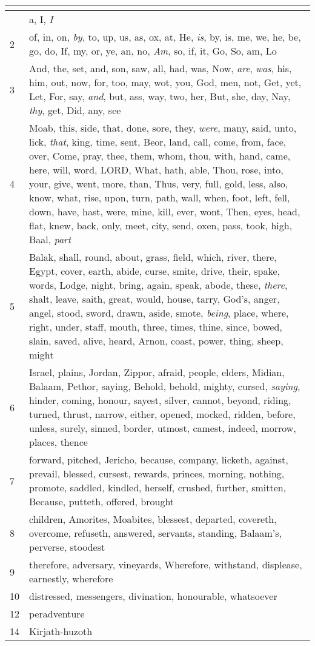 \begin{center}
\begin{longtable}{l|p{3.75in}}
\hline \multicolumn{2}{c}{{ }} \\ \hline
\endfoot 
1 & a, I, \emph{I}\\ \hline 
2 & of, in, on, \emph{by}, to, up, us, as, ox, at, He, \emph{is}, by, is, me, we, he, be, go, do, If, my, or, ye, an, no, \emph{Am}, so, if, it, Go, So, am, Lo\\ \hline 
3 & And, the, set, and, son, saw, all, had, was, Now, \emph{are}, \emph{was}, his, him, out, now, for, too, may, wot, you, God, men, not, Get, yet, Let, For, say, \emph{and}, but, ass, way, two, her, But, she, day, Nay, \emph{thy}, get, Did, any, see\\ \hline 
4 & Moab, this, side, that, done, sore, they, \emph{were}, many, said, unto, lick, \emph{that}, king, time, sent, Beor, land, call, come, from, face, over, Come, pray, thee, them, whom, thou, with, hand, came, here, will, word, LORD, What, hath, able, Thou, rose, into, your, give, went, more, than, Thus, very, full, gold, less, also, know, what, rise, upon, turn, path, wall, when, foot, left, fell, down, have, hast, were, mine, kill, ever, wont, Then, eyes, head, flat, knew, back, only, meet, city, send, oxen, pass, took, high, Baal, \emph{part}\\ \hline 
5 & Balak, shall, round, about, grass, field, which, river, there, Egypt, cover, earth, abide, curse, smite, drive, their, spake, words, Lodge, night, bring, again, speak, abode, these, \emph{there}, shalt, leave, saith, great, would, house, tarry, God's, anger, angel, stood, sword, drawn, aside, smote, \emph{being}, place, where, right, under, staff, mouth, three, times, thine, since, bowed, slain, saved, alive, heard, Arnon, coast, power, thing, sheep, might\\ \hline 
6 & Israel, plains, Jordan, Zippor, afraid, people, elders, Midian, Balaam, Pethor, saying, Behold, behold, mighty, cursed, \emph{saying}, hinder, coming, honour, sayest, silver, cannot, beyond, riding, turned, thrust, narrow, either, opened, mocked, ridden, before, unless, surely, sinned, border, utmost, camest, indeed, morrow, places, thence\\ \hline 
7 & forward, pitched, Jericho, because, company, licketh, against, prevail, blessed, cursest, rewards, princes, morning, nothing, promote, saddled, kindled, herself, crushed, further, smitten, Because, putteth, offered, brought\\ \hline 
8 & children, Amorites, Moabites, blessest, departed, covereth, overcome, refuseth, answered, servants, standing, Balaam's, perverse, stoodest\\ \hline 
9 & therefore, adversary, vineyards, Wherefore, withstand, displease, earnestly, wherefore\\ \hline 
10 & distressed, messengers, divination, honourable, whatsoever\\ \hline 
12 & peradventure\\ \hline 
14 & Kirjath-huzoth\\ \hline 
\end{longtable}
\end{center}





